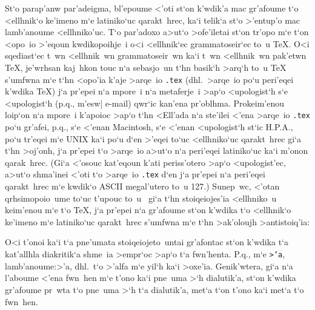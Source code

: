 St`o parap'anw par'adeigma, bl'epoume <'oti st`on k'wdik'a mac gr'afoume
t`o <ellhnik`o ke'imeno m`e latiniko`uc qarakt~hrec, ka`i telik`a st`o
>'entup'o mac lamb'anoume <ellhniko'uc.  T`o par'adoxo a>ut`o
>ofe'iletai st`on tr'opo m`e t`on <opo~io >'eqoun kwdikopoihje~i o<i
<ellhnik`ec grammatoseir`ec to~u {\rm \TeX}\null.  O<i sqediast`ec t~wn
<ellhnik~wn grammatoseir~wn ka`i t~wn <ellhnik~wn pak'etwn {\rm \TeX},
je'wrhsan kaj~hkon touc n`a sebasjo~un t`hn basik`h >arq`h to~u {\rm
\TeX} s'umfwna m`e t`hn <opo'ia k'aje >arqe~io {\tt .tex} (dhl.\
>arqe~io po`u peri'eqei k'wdika {\rm \TeX}) j`a pr'epei n`a mpore~i n`a
metaferje~i >ap`o <upologist`h s`e <upologist`h (p.q., m'esw| {\rm
e-mail}) qwr`ic kan'ena pr'oblhma.  Prokeim'enou loip`on n`a mpore~i
k'apoioc >ap`o t`hn <Ell'ada n`a ste'ilei <'ena >arqe~io {\tt .tex}
po`u gr'afei, p.q., s`e <'enan {\rm Macintosh}, s`e <'enan <upologist`h
st`ic H.P.A., po`u tr'eqei m`e {\rm UNIX} ka`i po`u d`en >'eqei
to`uc <ellhniko`uc qarakt~hrec gi`a t`hn >oj'onh, j`a pr'epei t`o
>arqe~io a>ut`o n`a peri'eqei latiniko`uc ka`i m'onon qarak~hrec. (Gi`a
<'osouc kat'eqoun k'ati periss'otero >ap`o <upologist'ec, a>ut`o
shma'inei <'oti t`o >arqe~io {\tt .tex} d`en j`a pr'epei n`a peri'eqei
qarakt~hrec m`e kwdik`o {\rm ASCII} megal'utero to~u 127.)  Sunep~wc,
<'otan qrhsimopoio~ume to`uc t'upouc to~u \greektex\ gi`a t`hn
stoiqeiojes'ia <ellhniko~u keim'enou m`e t`o {\rm\TeX}, j`a pr'epei n`a
gr'afoume st`on k'wdika t`o <ellhnik`o ke'imeno m`e latiniko`uc
qarakt~hrec s'umfwna m`e t`hn >ak'oloujh >antistoiq'ia:
\medskip
\centerline{\vbox{%
%
}%
}

O<i t'onoi ka`i t`a pne'umata stoi\-qei\-o\-jeto~untai gr'afontac st`on
k'wdika t`a kat'allhla dia\-kritik`a shme~ia >empr`oc >ap`o t`a
fwn'henta.  P.q., m`e {\tt >'a}, lamb'anoume:\NB{}>'a, dhl.\ t`o >'alfa
m`e yi\-l`h ka`i >oxe'ia.  Genik'wtera, gi`a n`a l'aboume <'ena fwn~hen
m`e t'ono ka`i pne~uma >`h dialutik'a, st`on k'wdika gr'afoume pr~wta
t`o pne~uma >`h t`a dialutik'a, met`a t`on t'ono ka`i met`a t`o
fwn~hen.

